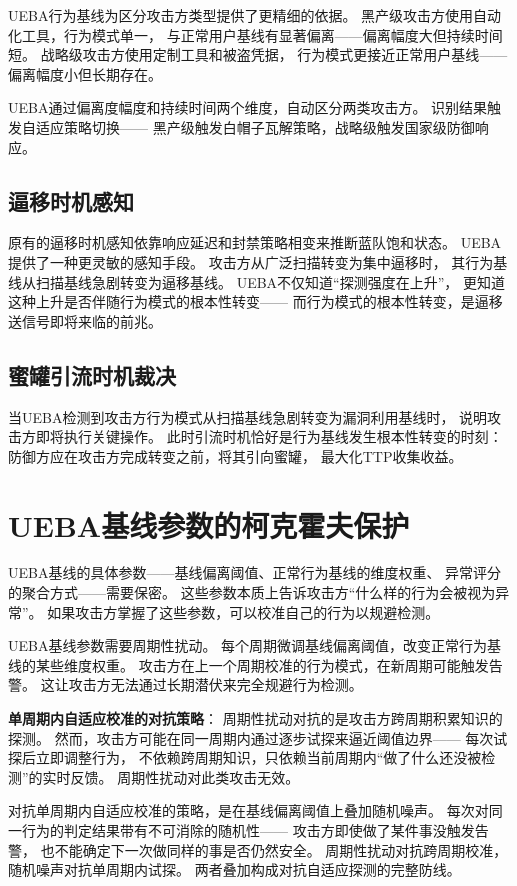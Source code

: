 \documentclass[11pt,a4paper]{article}
\begin{document}
UEBA行为基线为区分攻击方类型提供了更精细的依据。
黑产级攻击方使用自动化工具，行为模式单一，
与正常用户基线有显著偏离——偏离幅度大但持续时间短。
战略级攻击方使用定制工具和被盗凭据，
行为模式更接近正常用户基线——偏离幅度小但长期存在。

UEBA通过偏离度幅度和持续时间两个维度，自动区分两类攻击方。
识别结果触发自适应策略切换——
黑产级触发白帽子瓦解策略，战略级触发国家级防御响应。

\subsection{逼移时机感知}

原有的逼移时机感知依靠响应延迟和封禁策略相变来推断蓝队饱和状态。
UEBA提供了一种更灵敏的感知手段。
攻击方从广泛扫描转变为集中逼移时，
其行为基线从扫描基线急剧转变为逼移基线。
UEBA不仅知道“探测强度在上升”，
更知道这种上升是否伴随行为模式的根本性转变——
而行为模式的根本性转变，是逼移送信号即将来临的前兆。

\subsection{蜜罐引流时机裁决}

当UEBA检测到攻击方行为模式从扫描基线急剧转变为漏洞利用基线时，
说明攻击方即将执行关键操作。
此时引流时机恰好是行为基线发生根本性转变的时刻：
防御方应在攻击方完成转变之前，将其引向蜜罐，
最大化TTP收集收益。

\section{UEBA基线参数的柯克霍夫保护}

UEBA基线的具体参数——基线偏离阈值、正常行为基线的维度权重、
异常评分的聚合方式——需要保密。
这些参数本质上告诉攻击方“什么样的行为会被视为异常”。
如果攻击方掌握了这些参数，可以校准自己的行为以规避检测。

UEBA基线参数需要周期性扰动。
每个周期微调基线偏离阈值，改变正常行为基线的某些维度权重。
攻击方在上一个周期校准的行为模式，在新周期可能触发告警。
这让攻击方无法通过长期潜伏来完全规避行为检测。

\textbf{单周期内自适应校准的对抗策略}：
周期性扰动对抗的是攻击方跨周期积累知识的探测。
然而，攻击方可能在同一周期内通过逐步试探来逼近阈值边界——
每次试探后立即调整行为，
不依赖跨周期知识，只依赖当前周期内“做了什么还没被检测”的实时反馈。
周期性扰动对此类攻击无效。

对抗单周期内自适应校准的策略，是在基线偏离阈值上叠加随机噪声。
每次对同一行为的判定结果带有不可消除的随机性——
攻击方即使做了某件事没触发告警，
也不能确定下一次做同样的事是否仍然安全。
周期性扰动对抗跨周期校准，随机噪声对抗单周期内试探。
两者叠加构成对抗自适应探测的完整防线。
\end{document}
